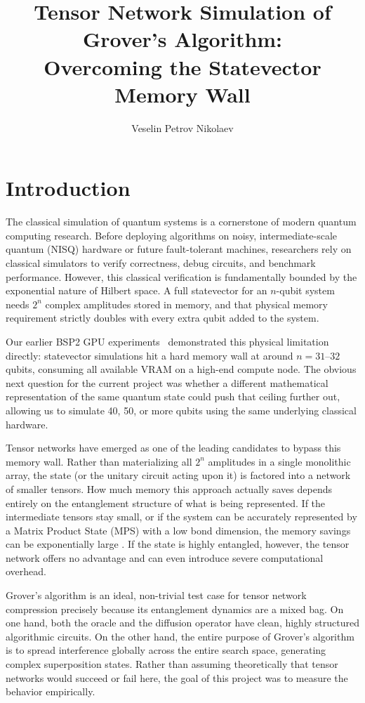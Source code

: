 \documentclass[sigconf, authorversion, nonacm]{acmart}
\title{Tensor Network Simulation of Grover's Algorithm:\texorpdfstring{\\}{ }
Overcoming the Statevector Memory Wall}
\author{Veselin Petrov Nikolaev}
\affiliation{%
  \institution{University of Luxembourg}
  \department{Faculty of Science, Technology and Medicine}
  \city{Luxembourg}
  \country{Luxembourg}
}
\begin{document}
\maketitle

\section{Introduction}

The classical simulation of quantum systems is a cornerstone of modern quantum computing research. Before deploying algorithms on noisy, intermediate-scale quantum (NISQ) hardware or future fault-tolerant machines, researchers rely on classical simulators to verify correctness, debug circuits, and benchmark performance. However, this classical verification is fundamentally bounded by the exponential nature of Hilbert space. A full statevector for an $n$-qubit system needs $2^n$ complex amplitudes stored in memory, and that physical memory requirement strictly doubles with every extra qubit added to the system.

Our earlier BSP2 GPU experiments~\cite{BSP2Report} demonstrated this physical limitation directly: statevector simulations hit a hard memory wall at around $n=31$--$32$ qubits, consuming all available VRAM on a high-end compute node. The obvious next question for the current project was whether a different mathematical representation of the same quantum state could push that ceiling further out, allowing us to simulate 40, 50, or more qubits using the same underlying classical hardware.

Tensor networks have emerged as one of the leading candidates to bypass this memory wall. Rather than materializing all $2^n$ amplitudes in a single monolithic array, the state (or the unitary circuit acting upon it) is factored into a network of smaller tensors. How much memory this approach actually saves depends entirely on the entanglement structure of what is being represented. If the intermediate tensors stay small, or if the system can be accurately represented by a Matrix Product State (MPS) with a low bond dimension, the memory savings can be exponentially large \cite{TensorNetworkMPS}. If the state is highly entangled, however, the tensor network offers no advantage and can even introduce severe computational overhead.

Grover's algorithm is an ideal, non-trivial test case for tensor network compression precisely because its entanglement dynamics are a mixed bag. On one hand, both the oracle and the diffusion operator have clean, highly structured algorithmic circuits. On the other hand, the entire purpose of Grover's algorithm is to spread interference globally across the entire search space, generating complex superposition states. Rather than assuming theoretically that tensor networks would succeed or fail here, the goal of this project was to measure the behavior empirically.
\end{document}
